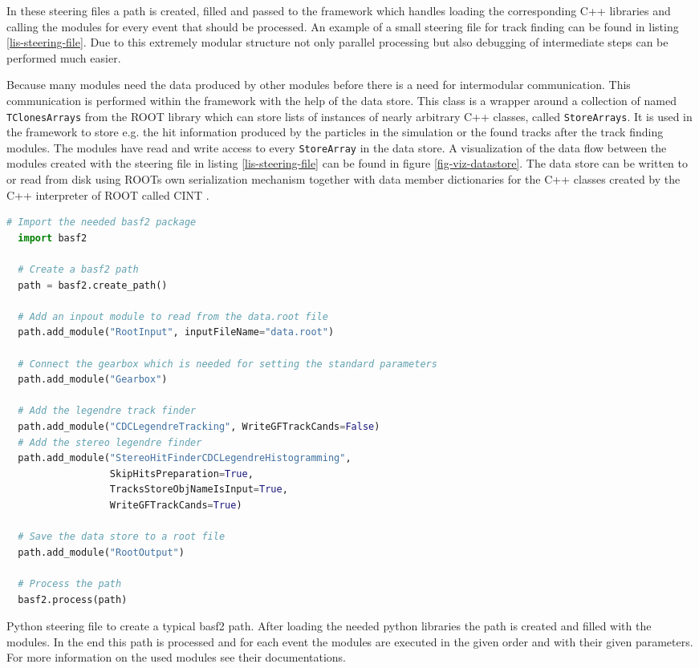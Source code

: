 In these steering files a path is created, filled and passed to the framework which handles loading the corresponding C++ libraries and calling the modules for every event that should be processed. An example of a small steering file for track finding can be found in listing \ref{lis-steering-file}. Due to this extremely modular structure not only parallel processing but also debugging of intermediate steps can be performed much easier.

Because many modules need the data produced by other modules before there is a need for intermodular communication. This communication is performed within the framework with the help of the data store. This class is a wrapper around a collection of named \texttt{TClonesArrays} from the ROOT library \cite{tclonesarray} which can store lists of instances of nearly arbitrary C++ classes, called \texttt{StoreArrays}. It is used in the framework to store e.g. the hit information produced by the particles in the simulation or the found tracks after the track finding modules. The modules have read and write access to every \texttt{StoreArray} in the data store. A visualization of the data flow between the modules created with the steering file in listing \ref{lis-steering-file} can be found in figure \ref{fig-viz-datastore}. The data store can be written to or read from disk using ROOTs own serialization mechanism together with data member dictionaries for the C++ classes created by the C++ interpreter of ROOT called CINT \cite{cint}.

\begin{listing}
 \begin{lstlisting}[language=Python]
  # Import the needed basf2 package
  import basf2

  # Create a basf2 path
  path = basf2.create_path()

  # Add an inpout module to read from the data.root file
  path.add_module("RootInput", inputFileName="data.root")
  
  # Connect the gearbox which is needed for setting the standard parameters
  path.add_module("Gearbox")

  # Add the legendre track finder
  path.add_module("CDCLegendreTracking", WriteGFTrackCands=False)
  # Add the stereo legendre finder
  path.add_module("StereoHitFinderCDCLegendreHistogramming",
                  SkipHitsPreparation=True,
                  TracksStoreObjNameIsInput=True,
                  WriteGFTrackCands=True)
  
  # Save the data store to a root file
  path.add_module("RootOutput")

  # Process the path
  basf2.process(path)

 \end{lstlisting}
 \caption[Python steering file to create a typical basf2 path.]{Python steering file to create a typical basf2 path. After loading the needed python libraries the path is created and filled with the modules. In the end this path is processed and for each event the modules are executed in the given order and with their given parameters. For more information on the used modules see their documentations.}
 \label{lis-steering-file}
\end{listing}


